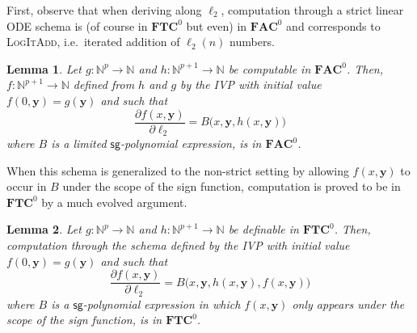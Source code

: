 \documentclass[11pt, oneside]{article}
\newcommand{\fun}[1]{\mathsf{#1}}
\newcommand{\sB}{B}
\newcommand{\Nat}{\mathbb{N}}
\newcommand{\AC}{\mathbf{FAC}}
\newcommand{\TC}{\mathbf{FTC}}
\newcommand{\tu}[1]{\mathbf{#1}}
\newtheorem{lemma}{Lemma}
\theoremstyle{definition}
\begin{document}
First, observe that when deriving along $\ell_2$, computation through a strict linear ODE schema is (of course in $\TC^0$ but even) in $\AC^0$ and corresponds to \textsc{LogItAdd}, i.e.~iterated addition of $\ell_2(n)$ numbers.


\begin{lemma}\label{lemma:logitadd}
    Let $g:\Nat^{p} \to \Nat$ and $h:\Nat^{p+1}\to \Nat$ be computable in $\AC^0$.
    Then, $f:\Nat^{p+1} \to \Nat$ defined from $h$ and $g$ by the IVP with initial value $f(0,\tu y)= g(\tu y)$ and such that
    $$
        \frac{\partial f(x, \tu y)}{\partial \ell_2} = \sB\big(x, \tu y, h(x, \tu y)\big)
    $$
    where $\sB$ is a limited $\fun{sg}$-polynomial expression,
    is in $\AC^0$.
\end{lemma}
%
\noindent
When this schema is generalized to the non-strict setting by allowing $f(x, \tu y)$ to occur in $B$ under the scope of the sign function, computation is proved to be in $\TC^0$ by a much evolved argument.

\begin{lemma}\label{lemma:l2TC}
        Let $g: \Nat^p \to \Nat$ and $h:\Nat^{p+1}\to \Nat$ be definable in $\TC^0$.
        Then, computation through the schema defined by the IVP with initial value 
            $f(0, \tu y) = g(\tu y)$
            and such that
            $$
            \frac{\partial f(x, \tu y)}{\partial \ell_2} = B\big(x, \tu y, h(x, \tu y), f(x, \tu y)\big)
            $$
            where $B$ is a $\fun{sg}$-polynomial expression 
        in which $f(x, \tu y)$ only appears under the scope of the sign function,
        is in $\TC^0$.
    \end{lemma}





\end{document}
